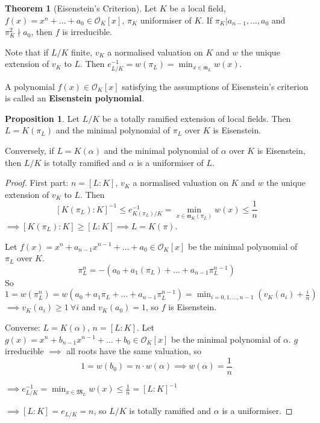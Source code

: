 \documentclass[a4paper]{article}
\theoremstyle{definition}
\theoremstyle{default}
\newtheorem{theorem}[definition]{Theorem}
\newtheorem{prop}[definition]{Proposition}
\theoremstyle{remark}
\begin{document}
\begin{theorem}[Eisenstein's Criterion]
	Let $K$ be a local field,
	$f(x) = x^n + \dots + a_0 \in \mathcal{O}_K[x]$, $\pi_K$ uniformiser of $K$.
	If $\pi_K | a_{n-1}, \dots, a_0$ and $\pi_K^2 \nmid a_0$,
	then $f$ is irreducible.
\end{theorem}

Note that if $L/K$ finite, $v_K$ a normalised valuation on $K$ and $w$ the unique extension of $v_K$ to $L$.
Then $e_{L/K}^{-1} = w(\pi_L) = \min_{x \in \mathfrak{m}_L}w(x)$.

A polynomial $f(x) \in \mathcal{O}_K[x]$ satisfying the assumptions of Eisenstein's criterion is called an \textbf{Eisenstein polynomial}.

\begin{prop}
	Let $L/K$ be a totally ramified extension of local fields.
	Then $L=K(\pi_L)$ and the minimal polynomial of $\pi_L$ over $K$ is Eisenstein.
	
	Conversely, if $L=K(\alpha)$ and the minimal polynomial of $\alpha$ over $K$ is Eisenstein,
	then $L/K$ is totally ramified and $\alpha$ is a uniformiser of $L$.
\end{prop}
\begin{proof}
	First part: $n=[L:K]$, $v_K$ a normalised valuation on $K$ and $w$ the unique extension of $v_K$ to $L$.
	Then
	$$[K(\pi_L):K]^{-1} \leq e^{-1}_{K(\pi_L)/K} = \min_{x \in \mathfrak{m}_K(\pi_L)}w(x) \leq \frac{1}{n}$$
	$\implies [K(\pi_L):K] \geq [L:K] \implies L = K(\pi)$.
	
	Let $f(x)=x^n + a_{n-1}x^{n-1} + \dots + a_0 \in \mathcal{O}_K[x]$ be the minimal polynomial of $\pi_L$ over $K$.
	$$\pi_L^n = -(a_0 + a_1(\pi_L) + \dots + a_{n-1}\pi_L^{n-1})$$
	So $1= w(\pi_L^n) = w(a_0 + a_1 \pi_L + \dots + a_{n-1}\pi_L^{n-1}) = \min_{i=0,1,\dots,n-1}(v_K(a_i)+\frac{i}{n})$
	$\implies v_K(a_i) \geq 1\ \forall i$ and $v_K(a_0)=1$, so $f$ is Eisenstein.
	
	Converse: $L=K(\alpha)$, $n=[L:K]$.
	Let $g(x) = x^n + b_{n-1}x^{n-1}+ \dots + b_0 \in \mathcal{O}_K[x]$ be the minimal polynomial of $\alpha$.
	$g$ irreducible $\implies$ all roots have the same valuation, so
	$$1 = w(b_0) = n\cdot w(\alpha) \implies w(\alpha) = \frac{1}{n}$$
	
	$\implies e_{L/K}^{-1} = \min_{x \in \mathfrak{M}_L}w(x) \leq \frac{1}{n} = [L:K]^{-1}$
	
	$\implies [L:K] = e_{L/K} = n$, so $L/K$ is totally ramified and $\alpha$ is a uniformiser.
\end{proof}
\end{document}
